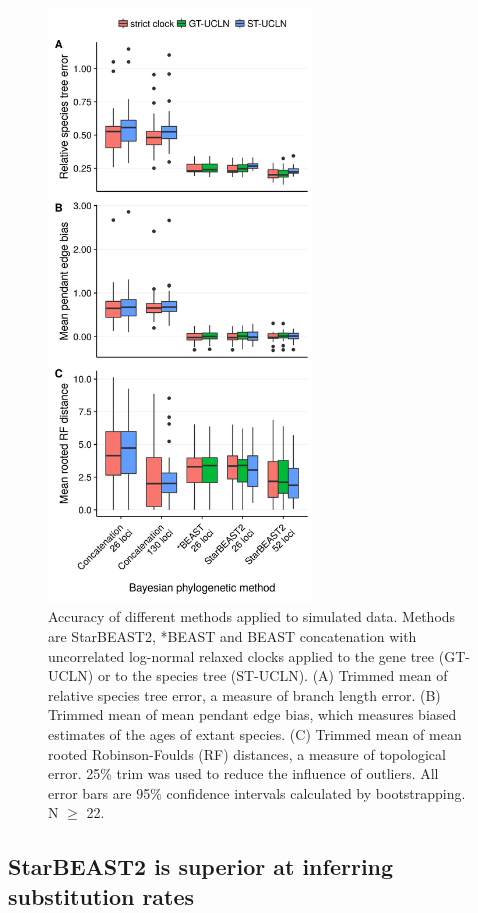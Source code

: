 \documentclass[12pt]{article}
\begin{document}
\begin{figure}[htb!]
\centering
\includegraphics[width=70mm]{tree_scores_boxplots_phased.png}
\caption
{Accuracy of different methods applied to simulated data. Methods are StarBEAST2,
*BEAST and BEAST concatenation with uncorrelated log-normal relaxed clocks applied
to the gene tree (GT-UCLN) or to the species tree (ST-UCLN). (A) Trimmed mean of
relative species tree error, a measure of branch length error. (B) Trimmed
mean of mean pendant edge bias, which measures biased estimates of the ages of
extant species. (C) Trimmed mean of mean rooted Robinson-Foulds (RF) distances, a
measure of topological error. 25\% trim was used to reduce the
influence of outliers. All error bars are 95\% confidence intervals calculated
by bootstrapping. N $\ge$ 22.}
\label{fig:speciesTreeError}
\end{figure}

\subsection{StarBEAST2 is superior at inferring substitution rates}
\end{document}
